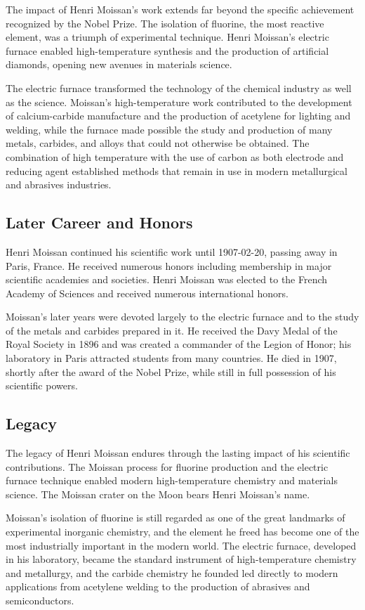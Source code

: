 The impact of Henri Moissan's work extends far beyond the specific achievement recognized by the Nobel Prize.
The isolation of fluorine, the most reactive element, was a triumph of experimental technique. Henri Moissan's electric furnace enabled high-temperature synthesis and the production of artificial diamonds, opening new avenues in materials science.

The electric furnace transformed the technology of the chemical industry as well as the science. Moissan's high-temperature work contributed to the development of calcium-carbide manufacture and the production of acetylene for lighting and welding, while the furnace made possible the study and production of many metals, carbides, and alloys that could not otherwise be obtained. The combination of high temperature with the use of carbon as both electrode and reducing agent established methods that remain in use in modern metallurgical and abrasives industries.

\subsection*{Later Career and Honors}

Henri Moissan continued his scientific work until 1907-02-20, passing away in Paris, France.
He received numerous honors including membership in major scientific academies and societies.
Henri Moissan was elected to the French Academy of Sciences and received numerous international honors.

Moissan's later years were devoted largely to the electric furnace and to the study of the metals and carbides prepared in it. He received the Davy Medal of the Royal Society in 1896 and was created a commander of the Legion of Honor; his laboratory in Paris attracted students from many countries. He died in 1907, shortly after the award of the Nobel Prize, while still in full possession of his scientific powers.

\subsection*{Legacy}

The legacy of Henri Moissan endures through the lasting impact of his scientific contributions.
The Moissan process for fluorine production and the electric furnace technique enabled modern high-temperature chemistry and materials science. The Moissan crater on the Moon bears Henri Moissan's name.

Moissan's isolation of fluorine is still regarded as one of the great landmarks of experimental inorganic chemistry, and the element he freed has become one of the most industrially important in the modern world. The electric furnace, developed in his laboratory, became the standard instrument of high-temperature chemistry and metallurgy, and the carbide chemistry he founded led directly to modern applications from acetylene welding to the production of abrasives and semiconductors.

